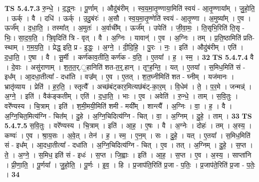 \documentclass[17pt]{extarticle}
\begin{document}
                  \newline
                                \textbf{ TS 5.4.7.3} \newline
                  रु॒न्धे॒ । द॒द्ध्नः । पू॒र्णाम् । औदु॑बंरीम् । स्व॒य॒मा॒तृ॒ण्णाया॒मिति॑ स्वयं - आ॒तृ॒ण्णाया᳚म् । जु॒हो॒ति॒ । ऊर्क् । वै । दधि॑ । ऊर्क् । उ॒दु॒बंरः॑ । अ॒सौ । स्व॒य॒मा॒तृ॒ण्णेति॑ स्वयं - आ॒तृ॒ण्णा । अ॒मुष्या᳚म् । ए॒व । ऊर्ज᳚म् । द॒धा॒ति॒ । तस्मा᳚त् । अ॒मुतः॑ । अ॒र्वाची᳚म् । ऊर्ज᳚म् । उपेति॑ । जी॒वा॒मः॒ । ति॒सृभि॒रिति॑ ति॒सृ - भिः॒। सा॒द॒य॒ति॒ । त्रि॒वृदिति॑ त्रि - वृत् । वै । अ॒ग्निः । यावान्॑ । ए॒व । अ॒ग्निः । तम् । प्र॒ति॒ष्ठामिति॑ प्रति-स्थाम् । ग॒म॒य॒ति॒ । प्रेद्ध॒ इति॒ प्र - इ॒द्धः॒ । अ॒ग्ने॒ । दी॒दि॒हि॒ । पु॒रः । नः॒ । इति॑ । औदु॑बंरीम् । एति॑ । द॒धा॒ति॒ । ए॒षा । वै । सू॒र्मी । कर्ण॑काव॒तीति॒ कर्ण॑क - व॒ति॒ । ए॒तया᳚ । ह॒ । स्म॒ । \textbf{  32} \newline
                  \newline
                                \textbf{ TS 5.4.7.4} \newline
                  वै । दे॒वाः । असु॑राणाम् । श॒त॒त॒र्.॒हानिति॑ शत-त॒र्॒.हान् । तृꣳ॒॒ह॒न्ति॒ । यत् । ए॒तया᳚ । स॒मिध॒मिति॑ सं - इध᳚म् । आ॒दधा॒तीत्या᳚ - दधा॑ति । वज्र᳚म् । ए॒व । ए॒तत् । श॒त॒घ्नीमिति॑ शत - घ्नीम् । यज॑मानः । भ्रातृ॑व्याय । प्रेति॑ । ह॒र॒ति॒ । स्तृत्यै᳚ । अच्छ॑बंट्कार॒मित्यछ॑बंट्-का॒र॒म् । वि॒धेम॑ । ते॒ । प॒र॒मे । जन्मन्न्॑ । अ॒ग्ने॒ । इति॑ । वैक॑ङ्कतीम् । एति॑ । द॒धा॒ति॒ । भाः । ए॒व । अवेति॑ । रु॒न्धे॒ । ताम् । स॒वि॒तुः । वरे᳚ण्यस्य । चि॒त्राम् । इति॑ । श॒मी॒मयी॒मिति॑ शमी - मयी᳚म् । शान्त्यै᳚ । अ॒ग्निः । वा॒ । ह॒ । वै । अ॒ग्नि॒चित॒मित्य॑ग्नि - चित᳚म् । दु॒हे । अ॒ग्नि॒चिदित्य॑ग्नि - चित् । वा॒ । अ॒ग्निम् । दु॒हे॒ । ताम् । \textbf{  33} \newline
                  \newline
                                \textbf{ TS 5.4.7.5} \newline
                  स॒वि॒तुः । वरे᳚ण्यस्य । चि॒त्राम् । इति॑ । आ॒ह॒ । ए॒षः । वै । अ॒ग्नेः । दोहः॑ । तम् । अ॒स्य॒ । कण्वः॑ । ए॒व । श्रा॒य॒सः । अ॒वे॒त् । तेन॑ । ह॒ । स्म॒ । ए॒न॒म् । सः । दु॒हे॒ । यत् । ए॒तया᳚ । स॒मिध॒मिति॑ सं - इध᳚म् । आ॒दधा॒तीत्या᳚ - दधा॑ति । अ॒ग्नि॒चिदित्य॑ग्नि - चित् । ए॒व । तत् । अ॒ग्निम् । दु॒हे॒ । स॒प्त । ते॒ । अ॒ग्ने॒ । स॒मिध॒ इति॑ सं - इधः॑ । स॒प्त । जि॒ह्वाः । इति॑ । आ॒ह॒ । स॒प्त । ए॒व । अ॒स्य॒ । साप्ता॑नि । प्री॒णा॒ति॒ । पू॒र्णया᳚ । जु॒हो॒ति॒ । पू॒र्णः । इ॒व॒ । हि । प्र॒जाप॑ति॒रिति॑ प्र॒जा - प॒तिः॒ । प्र॒जाप॑ते॒रिति॑ प्र॒जा - प॒तेः॒ । \textbf{  34} \newline
                  \newline
\end{document}
